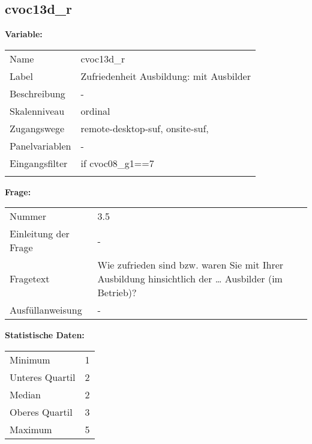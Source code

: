 	
	
	\subsection{cvoc13d\_r}
	\label{subSection:cvoc13d_r}

	\noindent\textbf{Variable:}\\
		\begin{tabular}{lL{11.3cm}}
			\label{tableVariable:cvoc13d_r}
			Name & cvoc13d\_r \\
			Label & Zufriedenheit Ausbildung: mit Ausbilder \\
			Beschreibung & - \\
			Skalenniveau & ordinal \\
			Zugangswege &
				remote-desktop-suf,
				onsite-suf,
 \\
			Panelvariablen & -
			 \\
			Eingangsfilter & if cvoc08\_g1==7 \\
 \\
		\end{tabular}

		\vspace*{1 cm}
		\noindent\textbf{Frage:}\\
		\begin{tabular}{lL{11.3cm}}
			\label{tableQuestion:cvoc13d_r}
			Nummer & 3.5 \\
			Einleitung der Frage & - \\
			Fragetext & Wie zufrieden sind bzw. waren Sie mit Ihrer Ausbildung hinsichtlich der …
Ausbilder (im Betrieb)? \\
			Ausfüllanweisung & - \\
		\end{tabular}


		\vspace*{1 cm}
		\noindent\textbf{Statistische Daten:}\\
			\begin{tabular}{ll}
				\label{tableStatistics:cvoc13d_r}
					Minimum & 1 \\
					Unteres Quartil & 2 \\
					Median & 2 \\
					Oberes Quartil & 3 \\
					Maximum & 5 \\
			\end{tabular}



